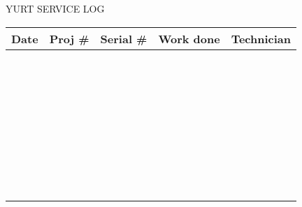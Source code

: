 \documentclass[11pt]{article}
\begin{document}
\sffamily\thispagestyle{empty}

\Large YURT SERVICE LOG

\enlargethispage{25pt}
\begin{tabular}{|p{0.4in}|p{0.4in}|p{0.8in}|p{4.2in}|p{0.8in}|} \hline
  \rowcolor{gray!45}
  \footnotesize Date & \footnotesize Proj \# & \footnotesize Serial \# & \footnotesize Work done 
  & \footnotesize Technician \\ \hline
& & & & \\ \hline
& & & & \\ \hline
& & & & \\ \hline
& & & & \\ \hline
& & & & \\ \hline
& & & & \\ \hline
& & & & \\ \hline
& & & & \\ \hline
& & & & \\ \hline
& & & & \\ \hline
& & & & \\ \hline
& & & & \\ \hline
& & & & \\ \hline
& & & & \\ \hline
& & & & \\ \hline
& & & & \\ \hline
& & & & \\ \hline
& & & & \\ \hline
& & & & \\ \hline
& & & & \\ \hline
& & & & \\ \hline
& & & & \\ \hline
& & & & \\ \hline
& & & & \\ \hline
& & & & \\ \hline
& & & & \\ \hline
& & & & \\ \hline
& & & & \\ \hline
& & & & \\ \hline
& & & & \\ \hline
& & & & \\ \hline
& & & & \\ \hline
& & & & \\ \hline
& & & & \\ \hline
& & & & \\ \hline
& & & & \\ \hline
\end{tabular}
\end{document}
